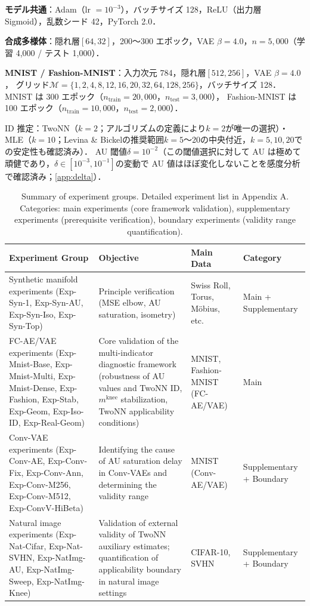 \documentclass[11pt,a4paper]{jsarticle}
\newcommand{\mknee}{m^{\mathrm{knee}}}
\begin{document}
\textbf{モデル共通}：Adam（lr $= 10^{-3}$），バッチサイズ 128，ReLU（出力層 Sigmoid），乱数シード 42，PyTorch 2.0．

\textbf{合成多様体}：隠れ層$[64, 32]$，200〜300 エポック，VAE $\beta = 4.0$，$n = 5{,}000$（学習 4,000 / テスト 1,000）．

\textbf{MNIST / Fashion-MNIST}：入力次元 784，隠れ層$[512, 256]$，VAE $\beta = 4.0$，
グリッド$\mathcal{M} = \{1,2,4,8,12,16,20,32,64,128,256\}$，バッチサイズ 128．
MNIST は 300 エポック（$n_{\mathrm{train}} = 20{,}000$，$n_{\mathrm{test}} = 3{,}000$），
Fashion-MNIST は 100 エポック（$n_{\mathrm{train}} = 10{,}000$，$n_{\mathrm{test}} = 2{,}000$）．

ID 推定：TwoNN（$k=2$；アルゴリズムの定義により$k=2$が唯一の選択）・MLE（$k=10$；Levina \& Bickel\cite{levina2005mle}の推奨範囲$k=5$〜20の中央付近，$k=5,10,20$での安定性も確認済み）\cite{facco2017twonn,levina2005mle}．
AU 閾値$\delta = 10^{-2}$\cite{lucas2019elbo}（この閾値選択に対して AU は極めて頑健であり，$\delta \in [10^{-3}, 10^{-1}]$の変動で AU 値はほぼ変化しないことを感度分析で確認済み；\ref{app:delta}）．

\begin{table}[H]
\centering
\caption{Summary of experiment groups. Detailed experiment list in Appendix A. Categories: main experiments (core framework validation), supplementary experiments (prerequisite verification), boundary experiments (validity range quantification).}
\label{tab:exp_list}
\small
\begin{tabular}{p{4.5cm}p{4.0cm}p{3.0cm}p{2.5cm}}
\toprule
Experiment Group & Objective & Main Data & Category \\
\midrule
Synthetic manifold experiments
(Exp-Syn-1, Exp-Syn-AU, Exp-Syn-Iso, Exp-Syn-Top)
  & Principle verification (MSE elbow, AU saturation, isometry)
  & Swiss Roll, Torus, Möbius, etc.
  & Main + Supplementary \\
\addlinespace
FC-AE/VAE experiments
(Exp-Mnist-Base, Exp-Mnist-Multi, Exp-Mnist-Dense, Exp-Fashion, Exp-Stab, Exp-Geom, Exp-Iso-ID, Exp-Real-Geom)
  & Core validation of the multi-indicator diagnostic framework (robustness of AU values and TwoNN ID, $\mknee$ stabilization, TwoNN applicability conditions)
  & MNIST, Fashion-MNIST (FC-AE/VAE)
  & Main \\
\addlinespace
Conv-VAE experiments
(Exp-Conv-AE, Exp-Conv-Fix, Exp-Conv-Ann, Exp-Conv-M256, Exp-Conv-M512, Exp-ConvV-HiBeta)
  & Identifying the cause of AU saturation delay in Conv-VAEs and determining the validity range
  & MNIST (Conv-AE/VAE)
  & Supplementary + Boundary \\
\addlinespace
Natural image experiments
(Exp-Nat-Cifar, Exp-Nat-SVHN, Exp-NatImg-AU, Exp-NatImg-Sweep, Exp-NatImg-Knee)
  & Validation of external validity of TwoNN auxiliary estimates; quantification of applicability boundary in natural image settings
  & CIFAR-10, SVHN
  & Supplementary + Boundary \\
\bottomrule
\end{tabular}
\end{table}
\end{document}
